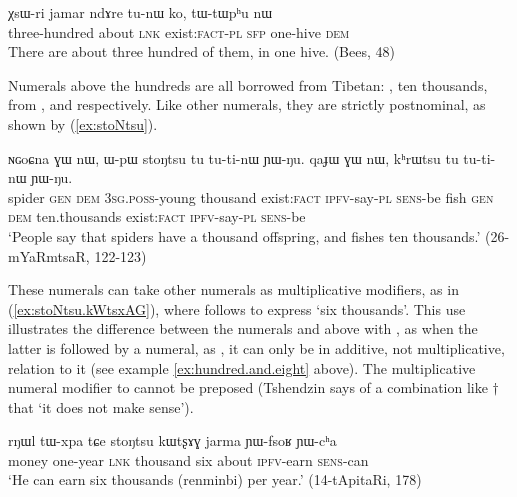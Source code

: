 \begin{exe}
\ex \label{ex:three.hundreds}
\gll χsɯ-ri 	jamar 	ndɤre 	tu-nɯ 	ko, 	tɯ-tɯpʰu 	nɯ \\
three-hundred about \textsc{lnk} exist:\textsc{fact-pl} \textsc{sfp} one-hive \textsc{dem} \\
\glt There are about three hundred of them, in one hive. (Bees, 48)
\end{exe}
 
  Numerals above the hundreds are all borrowed from Tibetan: ,  {ten thousands},  from ,  and  respectively.  Like other numerals, they are strictly postnominal, as shown by (\ref{ex:stoNtsu}).


\begin{exe}
\ex \label{ex:stoNtsu}
\gll ɴɢoɕna ɣɯ nɯ, ɯ-pɯ stoŋtsu tu tu-ti-nɯ ɲɯ-ŋu. qaɟɯ ɣɯ nɯ, kʰrɯtsu tu tu-ti-nɯ ɲɯ-ŋu. \\
spider \textsc{gen} \textsc{dem} \textsc{3sg}.\textsc{poss}-young thousand exist:\textsc{fact} \textsc{ipfv}-say-\textsc{pl} \textsc{sens}-be fish \textsc{gen} \textsc{dem} ten.thousands exist:\textsc{fact} \textsc{ipfv}-say-\textsc{pl} \textsc{sens}-be  \\
\glt `People say that spiders have a thousand offspring, and fishes ten thousands.' (26-mYaRmtsaR, 122-123)
\end{exe}

These numerals can take other numerals as multiplicative modifiers, as in (\ref{ex:stoNtsu.kWtsxAG}), where  follows   to express `six thousands'. This use illustrates the difference between the numerals  and above with , as when the latter is followed by a numeral, as , it can only be in additive, not multiplicative, relation to it (see example \ref{ex:hundred.and.eight} above). The multiplicative numeral modifier to  cannot be preposed (Tshendzin says of a combination like $\dagger$ that  `it does not make sense').

\begin{exe}
\ex  \label{ex:stoNtsu.kWtsxAG}
 \gll   rŋɯl tɯ-xpa tɕe stoŋtsu kɯtʂɤɣ jarma ɲɯ-fsoʁ ɲɯ-cʰa \\
 money one-year \textsc{lnk} thousand six about \textsc{ipfv}-earn \textsc{sens}-can \\
 \glt `He can earn six thousands (renminbi) per year.' (14-tApitaRi, 178)
\end{exe}
  
